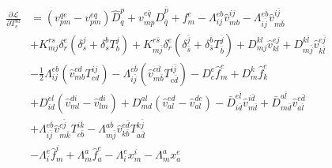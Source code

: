 \documentclass[a4paper,12pt,oneside]{book}
\newcommand{\spa}[1]{{#1}}
\newcommand{\spb}[1]{\bar{#1}}
\newcommand{\half}{\frac{1}{2}}
\begin{document}
\begin{equation}
\begin{aligned}
\frac{\partial\mathcal{L}}{\partial T^{\spa{m}}_{\spa{e}}}&=
\left(v_{\spa{p}\spa{m}}^{\spa{q}\spa{e}} - v_{\spa{p}\spa{m}}^{\spa{e}\spa{q}}\right) \hat D^{\spa{p}}_{\spa{q}}
+ v_{\spa{m}\spb{p}}^{\spa{e}\spb{q}} \hat D^{\spb{p}}_{\spb{q}}
+ f_{\spa{m}}^{\spa{e}}
- Λ_{\spa{i}\spa{j}}^{\spa{e}\spa{b}} \hat v_{\spa{m}\spa{b}}^{\spa{i}\spa{j}}
- Λ_{\spa{i}\spb{j}}^{\spa{e}\spb{b}} \hat v_{\spa{m}\spb{b}}^{\spa{i}\spb{j}}\\
&+ K_{\spa{m}\spa{j}}^{\spa{r}\spa{s}} \delta_{\spa{r}}^{\spa{e}} \left(\delta_{\spa{s}}^{\spa{j}} + \delta_{\spa{s}}^{\spa{b}} T^{\spa{j}}_{\spa{b}} \right) 
+ K_{\spa{m}\spb{j}}^{\spa{r}\spb{s}} \delta_{\spa{r}}^{\spa{e}} \left(\delta_{\spb{s}}^{\spb{j}} + \delta_{\spb{s}}^{\spb{b}} T^{\spb{j}}_{\spb{b}} \right) 
+ D_{\spa{m}\spa{j}}^{\spa{k}\spa{l}} \hat v_{\spa{k}\spa{l}}^{\spa{e}\spa{j}}
+ D_{\spa{m}\spb{j}}^{\spa{k}\spb{l}} \hat v_{\spa{k}\spb{l}}^{\spa{e}\spb{j}}\\
&- \half Λ_{\spa{i}\spa{j}}^{\spa{e}\spa{b}} \left(\hat v_{\spa{m}\spa{b}}^{\spa{c}\spa{d}} T^{\spa{i}\spa{j}}_{\spa{c}\spa{d}}\right)
- Λ_{\spa{i}\spb{j}}^{\spa{e}\spb{b}} \left(\hat v_{\spa{m}\spb{b}}^{\spa{c}\spb{d}} T^{\spa{i}\spb{j}}_{\spa{c}\spb{d}}\right)
- D_{\spa{c}}^{\spa{e}} \hat f_{\spa{m}}^{\spa{c}}
+ D_{\spa{m}}^{\spa{k}} \hat f_{\spa{k}}^{\spa{e}}\\
&+ D_{\spa{i}\spa{d}}^{\spa{e}\spa{l}} 
 \left(\hat v_{\spa{m}\spa{l}}^{\spa{d}\spa{i}}-\hat v_{\spa{l}\spa{m}}^{\spa{d}\spa{i}}\right)
+ D_{\spa{m}\spa{d}}^{\spa{a}\spa{l}} 
 \left(\hat v_{\spa{a}\spa{l}}^{\spa{e}\spa{d}}-\hat v_{\spa{a}\spa{l}}^{\spa{d}\spa{e}}\right) 
- \bar D_{\spa{i}\spb{d}}^{\spa{e}\spb{l}} \hat v_{\spa{m}\spb{l}}^{\spa{i}\spb{d}}  
+ \bar D_{\spa{m}\spb{d}}^{\spa{a}\spb{l}} \hat v_{\spa{a}\spb{l}}^{\spa{e}\spb{d}} \\
&+ Λ_{\spa{i}\spb{j}}^{\spa{e}\spb{b}} 
\hat v_{\spa{m}\spb{k}}^{\spa{c}\spb{j}} T^{\spa{i}\spb{k}}_{\spa{c}\spb{b}}
- Λ_{\spa{m}\spb{j}}^{\spa{a}\spb{b}} 
\hat v_{\spa{k}\spb{b}}^{\spa{e}\spb{d}} T^{\spa{k}\spb{j}}_{\spa{a}\spb{d}}\\
&-Λ_{\spa{i}}^{\spa{e}} \hat f_{\spa{m}}^{\spa{i}} 
+Λ_{\spa{m}}^{\spa{a}} \hat f_{\spa{a}}^{\spa{e}} 
- Λ_{\spa{i}}^{\spa{e}} x_{\spa{m}}^{\spa{i}}
- Λ_{\spa{m}}^{\spa{a}} x_{\spa{a}}^{\spa{e}}
\end{aligned}
\end{equation}
\end{document}
